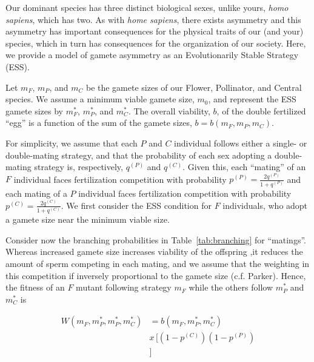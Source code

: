 



Our dominant species has three distinct biological sexes, unlike yours, \emph{homo sapiens}, which has two. As with \emph{home sapiens}, there exists asymmetry and this asymmetry has important consequences for the physical traits of our (and your) species, which in turn has consequences for the organization of our society. Here, we provide a model of gamete asymmetry as an Evolutionarily Stable Strategy (ESS).

Let $m_F$, $m_P$, and $m_C$ be the gamete sizes of our Flower, Pollinator, and Central species. We assume a minimum viable gamete size, $m_0$, and represent the ESS gamete sizes by  $m^*_F$, $m^*_P$, and $m^*_C$. The overall viability, $b$, of the double fertilized ``egg'' is a function of the sum of the gamete sizes, $b=b(m_F,m_P,m_C)$.

For simplicity, we assume that each $P$ and $C$ individual follows either a single- or double-mating strategy, and that the probability of each sex adopting a double-mating strategy is, respectively, $q^{(P)}$ and $q^{(C)}$. Given this, each ``mating'' of an $F$ individual faces fertilization competition with probability $p^{(P)} = \frac{2 q^{(P)}}{1+q^{(P)}}$ and each mating of a $P$ individual faces fertilization competition with probability $p^{(C)} = \frac{2 q^{(C)}}{1+q^{(C)}}$. We first consider the ESS condition for $F$ individuals, who adopt a gamete size near the minimum viable size.

Consider now the branching probabilities in Table~\ref{tab:branching} for ``matings''. Whereas increased gamete size increases viability of the offspring ,it reduces the amount of sperm competing in each mating, and we assume that the weighting in this competition if inversely proportional to the gamete size (c.f. Parker). Hence, the fitness of an $F$ mutant following strategy $m_F$ while the others follow $m_P^*$ and $m_C^*$ is

\begin{align}
  \label{eq:W_F}
  W(m_F,m_P^*,m_P^*,m_C^*) &= b(m_F,m_P^*,m_C^*) \nonumber \\ 
  &x \, [(1-p^{(C)})(1-p^{(P)})\nonumber \\
  &]
\end{align}

